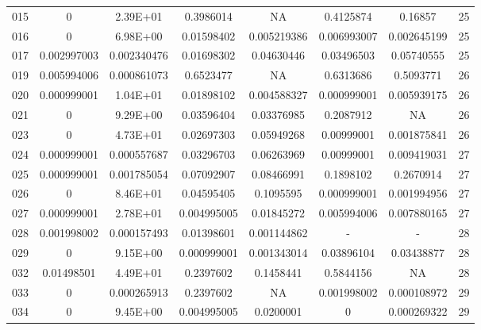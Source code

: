 {\begin{longtable}{cccccccc}
015 & {\color{red}0} & 2.39E+01 & 0.3986014 & NA & 0.4125874 & 0.16857 & 25 \\
016 & {\color{red}0} & 6.98E+00 & {\color{red}0.01598402} & {\color{red}0.005219386} & {\color{red}0.006993007} & {\color{red}0.002645199} & 25 \\
017 & {\color{red}0.002997003} & {\color{red}0.002340476} & {\color{red}0.01698302} & {\color{red}0.04630446} & {\color{red}0.03496503} & 0.05740555 & 25 \\
019 & {\color{red}0.005994006} & {\color{red}0.000861073} & 0.6523477 & NA & 0.6313686 & 0.5093771 & 26 \\
020 & {\color{red}0.000999001} & 1.04E+01 & {\color{red}0.01898102} & {\color{red}0.004588327} & {\color{red}0.000999001} & {\color{red}0.005939175} & 26 \\
021 & {\color{red}0} & 9.29E+00 & {\color{red}0.03596404} & {\color{red}0.03376985} & 0.2087912 & NA & 26 \\
023 & 0 & 4.73E+01 & 0.02697303 & 0.05949268 & 0.00999001 & 0.001875841 & 26 \\
024 & {\color{red}0.000999001} & {\color{red}0.000557687} & {\color{red}0.03296703} & 0.06263969 & {\color{red}0.00999001} & {\color{red}0.009419031} & 27 \\
025 & {\color{red}0.000999001} & {\color{red}0.001785054} & 0.07092907 & 0.08466991 & 0.1898102 & 0.2670914 & 27 \\
026 & {\color{red}0} & 8.46E+01 & {\color{red}0.04595405} & 0.1095595 & {\color{red}0.000999001} & {\color{red}0.001994956} & 27 \\
027 & {\color{red}0.000999001} & 2.78E+01 & {\color{red}0.004995005} & {\color{red}0.01845272} & {\color{red}0.005994006} & {\color{red}0.007880165} & 27 \\
028 & {\color{red}0.001998002} & {\color{red}0.000157493} & {\color{red}0.01398601} & {\color{red}0.001144862} & - & - &  28 \\
029 & {\color{red}0} & 9.15E+00 & {\color{red}0.000999001} & {\color{red}0.001343014} & {\color{red}0.03896104} & {\color{red}0.03438877} & 28 \\
032 & {\color{red}0.01498501} & 4.49E+01 & 0.2397602 & 0.1458441 & 0.5844156 & NA & 28 \\
033 & {\color{red}0} & {\color{red}0.000265913} & 0.2397602 & NA & {\color{red}0.001998002} & {\color{red}0.000108972} & 29 \\
034 & {\color{red}0} & 9.45E+00 & {\color{red}0.004995005} & {\color{red}0.0200001} & {\color{red}0} & {\color{red}0.000269322} & 29 \\

\end{longtable}}

